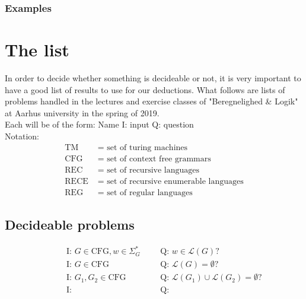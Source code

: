 \documentclass{article}
\theoremstyle{remark}
\numberwithin{equation}{section}
\begin{document}
\subsubsection{Examples}

\section{The list}
In order to decide whether something is decideable or not, it is very important to have a good list of results to use for our deductions. What follows are lists of problems handled in the lectures and exercise classes of "Beregnelighed \& Logik" at Aarhus university in the spring of 2019.\\
Each will be of the form: Name I: input Q: question\\
Notation:
\begin{align*}
	\text{TM }&=\text{ set of turing machines}\\
	\text{CFG }&=\text{ set of context free grammars}\\
	\text{REC }&=\text{ set of recursive languages}\\
	\text{RECE }&=\text{ set of recursive enumerable languages}\\
	\text{REG }&=\text{ set of regular languages}
\end{align*}
\subsection{Decideable problems}
\begin{align}
	&\text{} &&\text{I: }G\in\text{CFG},w\in\Sigma_G^* &&&\text{Q: }w\in\mathcal{L}(G)?\\
	&\text{} &&\text{I: }G\in\text{CFG} &&&\text{Q: }\mathcal{L}(G)=\emptyset?\\
	&\text{} &&\text{I: }G_1,G_2\in\text{CFG} &&&\text{Q: }\mathcal{L}(G_1)\cup\mathcal{L}(G_2)=\emptyset?\\
	&\text{} &&\text{I:} &&&\text{Q:}
\end{align}
\end{document}
